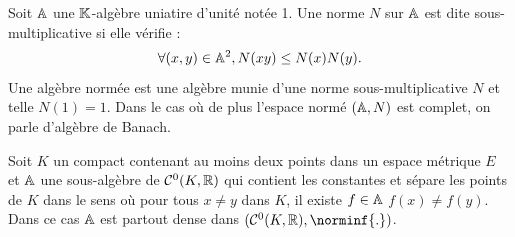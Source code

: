 \begin{defn}
Soit $\mathbb{A}$ une $\mathbb{K}$-algèbre uniatire d'unité notée 1. Une norme $N$ sur $\mathbb{A}$ est dite sous-multiplicative si elle vérifie :
\[ \forall (x,y) \in \mathbb{A}^2, N(xy) \leq N(x)N(y). \]
Une algèbre normée est une algèbre munie d'une norme sous-multiplicative $N$ et telle $N(1)=1$. 
Dans le cas où de plus l'espace normé $(\mathbb{A}, N)$ est complet, on parle d'algèbre de Banach.
\end{defn}

\begin{thm}
Soit $K$ un compact contenant au moins deux points dans un espace métrique $E$ et 
$\mathbb{A}$ une sous-algèbre de $\mathcal{C}^0(K, \mathbb{R})$ qui contient les constantes et sépare les points de $K$
dans le sens où pour tous $x \neq y$ dans $K$, il existe $f \in \mathbb{A}$ \tq $f(x) \neq f(y)$.
Dans ce cas $\mathbb{A}$ est partout dense dans $(\C^0(K, \R), \norminf{.})$.
\end{thm}

